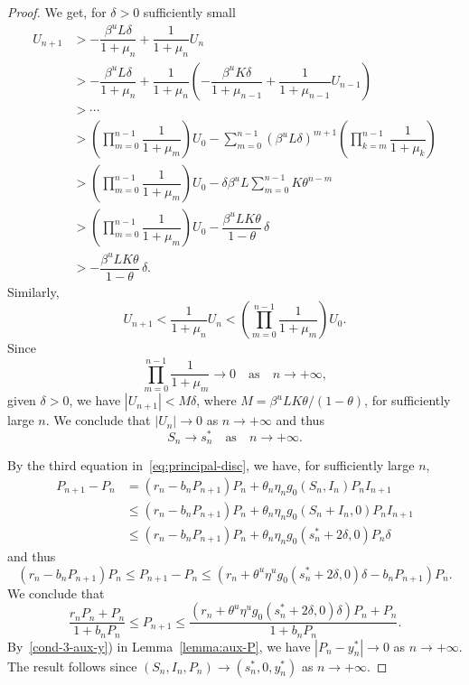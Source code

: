 \documentclass[reqno]{amsart}
\renewcommand{\le}{\leqslant}
\begin{document}
{{\begin{proof}
We get, for $\delta>0$ sufficiently small
\[
\begin{split}
U_{n+1}
& > -\dfrac{\beta^u L \delta}{1+\mu_n}+\dfrac{1}{1+\mu_n}U_n\\
& > -\dfrac{\beta^u L \delta}{1+\mu_n}+\dfrac{1}{1+\mu_n}\left(-\dfrac{\beta^u K \delta}{1+\mu_{n-1}}+\dfrac{1}{1+\mu_{n-1}}U_{n-1}\right)\\
& > \cdots\\
& > \left(\prod_{m=0}^{n-1}\dfrac{1}{1+\mu_m}\right)U_0 - \sum_{m=0}^{n-1} (\beta^u L \delta)^{m+1} \left(\prod_{k=m}^{n-1}\dfrac{1}{1+\mu_k}\right)\\
& > \left(\prod_{m=0}^{n-1}\dfrac{1}{1+\mu_m}\right)U_0 - \delta \beta^u L \sum_{m=0}^{n-1} K \theta^{n-m}\\
& > \left(\prod_{m=0}^{n-1}\dfrac{1}{1+\mu_m}\right)U_0 - \dfrac{\beta^u LK\theta}{1-\theta}\,\delta\\
& > - \dfrac{\beta^u LK\theta}{1-\theta}\,\delta.
\end{split}
\]
Similarly,
\[
U_{n+1} < \dfrac{1}{1+\mu_n}U_n < \left(\prod_{m=0}^{n-1}\dfrac{1}{1+\mu_m}\right)U_0.
\]
Since
$$\prod_{m=0}^{n-1}\dfrac{1}{1+\mu_m} \to 0 \quad \text{as} \quad {n \to +\infty},$$
given $\delta>0$, we have $|U_{n+1}|<M\delta$, where $M=\beta^uLK\theta/(1-\theta)$, for sufficiently large $n$. We conclude that $|U_n|\to 0$ as $n \to +\infty$ and thus
\begin{equation}\label{eq:Sn-to-Sn*}
S_n\to s_n^* \quad \text{as} \quad n \to +\infty.
\end{equation}

By the third equation in~\eqref{eq:principal-disc}, we have, for sufficiently large $n$,
\[
\begin{split}
P_{n+1}-P_n
& =(r_n-b_nP_{n+1})P_n+\theta_n\eta_ng_0(S_n,I_n)P_nI_{n+1}\\
& \le (r_n-b_nP_{n+1})P_n+\theta_n\eta_ng_0(S_n+I_n,0)P_nI_{n+1}\\
& \le (r_n-b_nP_{n+1})P_n+\theta_n\eta_ng_0(s_n^*+2\delta,0)P_n\delta
\end{split}
\]
and thus
$$(r_n-b_nP_{n+1})P_n\le P_{n+1}-P_n\le (r_n+\theta^u\eta^ug_0(s_n^*+2\delta,0)\delta-b_nP_{n+1})P_n.$$
We conclude that
$$\dfrac{r_nP_n+P_n}{1+b_nP_n} \le P_{n+1}\le \dfrac{\left(r_n+\theta^u\eta^ug_0(s_n^*+2\delta,0)\delta\right)P_n+P_n}{1+b_nP_n}.$$
By~\ref{cond-3-aux-y}) in Lemma~\ref{lemma:aux-P}, we have $|P_n-y_n^*| \to 0$ as $n \to +\infty$.
The result follows since $(S_n,I_n,P_n)\to(s^*_n,0,y^*_n)$ as $n \to +\infty$.
\end{proof}

}}
\end{document}
